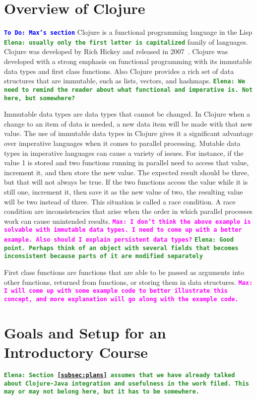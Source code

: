 \documentclass[12pt]{article}
\newcommand{\comment}[1]{{\bf \tt  {#1}}}
\newcommand{\emcomment}[1]{\textcolor{ForestGreen}{\comment{Elena: {#1}}}}
\newcommand{\todo}[1]{\textcolor{blue}{\comment{To Do: {#1}}}}
\newcommand{\mmcomment}[1]{\textcolor{magenta}{\comment{Max: {#1}}}}
\begin{document}
\section{Overview of Clojure}\label{sec:clojure}
\todo{Max's section}
Clojure is a functional programming language in the Lisp \emcomment{usually only the first letter is capitalized} family of languages. Clojure was developed by Rich Hickey and released in 2007~\cite{Hickey:2008}. Clojure was developed with a strong emphasis on functional programming with its immutable data types and first class functions. Also Clojure provides a rich set of data structures that are immutable, such as lists, vectors, and hashmaps.
\emcomment{We need to remind the reader about what functional and imperative is. Not here, but somewhere?}

Immutable data types are data types that cannot be changed. In Clojure when a change to an item of data is needed, a new data item will be made with that new value. The use of immutable data types in Clojure gives it a significant advantage over imperative languages when it comes to parallel processing. Mutable data types in imperative languages can cause a variety of issues. For instance, if the value 1 is stored and two functions running in parallel need to access that value, increment it, and then store the new value. The expected result should be three, but that will not always be true. If the two functions access the value while it is still one, increment it, then save it as the new value of two, the resulting value will be two instead of three. This situation is called a race condition. A race condition are inconsistencies that arise when the order in which parallel processes work can cause unintended results.
\mmcomment{I don't think the above example is solvable with immutable data types. I need to come up with a better example. Also should I explain persistent data types?}
\emcomment{Good point. Perhaps think of an object with several fields that becomes inconsistent because parts of it are modified separately}

First class functions are functions that are able to be passed as arguments into other functions, returned from functions, or storing them in data structures.
\mmcomment{I will come up with some example code to better illustrate this concept, and more explanation will go along with the example code.}   

\section{Goals and Setup for an Introductory Course}\label{sec:racket-clojure}
\emcomment{Section~\ref{subsec:plans} assumes that we have already talked about Clojure-Java integration and usefulness in the work filed. This may or may not belong here, but it has to be somewhere.}
\end{document}
